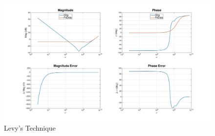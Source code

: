 \begin{figure}[ht!]
\includegraphics[keepaspectratio=true,width=6in]{./figures/regression/levy.jpg}
\centering
\caption{Levy's Technique}
\label{fig:levy}
\end{figure}

